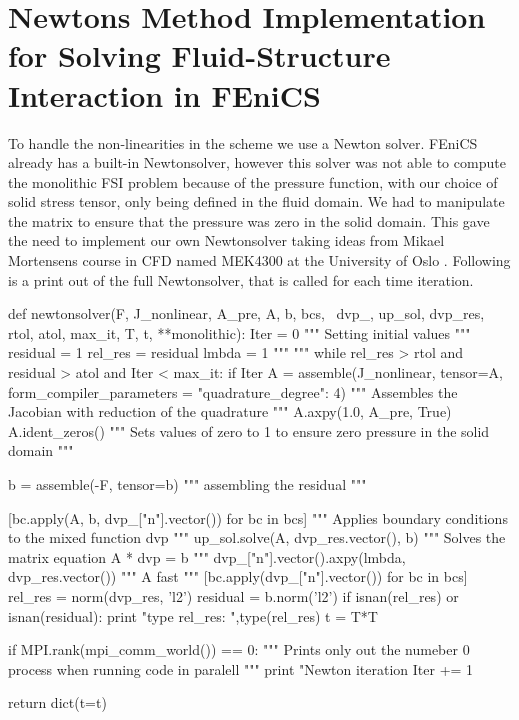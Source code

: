 \section{Newtons Method Implementation for Solving Fluid-Structure Interaction in FEniCS}
To handle the non-linearities in the scheme we use a Newton solver. FEniCS already has a built-in Newtonsolver, however this solver was not able to compute the monolithic FSI problem because of the pressure function, with our choice of solid stress tensor, only being defined in the fluid domain. We had to manipulate the matrix to ensure that the pressure was zero in the solid domain. This gave the need to implement our own Newtonsolver taking ideas from Mikael Mortensens course in CFD named MEK4300 at the University of Oslo \cite{White2006}.
Following is a print out of the full Newtonsolver, that is called for each time iteration.
\newpage
\begin{python}
def newtonsolver(F, J_nonlinear, A_pre, A, b, bcs, \
                dvp_, up_sol, dvp_res, rtol, atol, max_it, T, t, **monolithic):
    Iter      = 0  """ Setting initial values """
    residual   = 1  
    rel_res    = residual
    lmbda = 1 """  """
    while rel_res > rtol and residual > atol and Iter < max_it:
        if Iter %
            A = assemble(J_nonlinear, tensor=A, form_compiler_parameters = {"quadrature_degree": 4}) """ Assembles the Jacobian with reduction of the quadrature """
            A.axpy(1.0, A_pre, True)
            A.ident_zeros()  """ Sets values of zero to 1 to ensure zero pressure in the solid domain """

        b = assemble(-F, tensor=b) """ assembling the residual  """

        [bc.apply(A, b, dvp_["n"].vector()) for bc in bcs] """ Applies boundary conditions to the mixed function dvp """
        up_sol.solve(A, dvp_res.vector(), b) """ Solves the matrix equation A * dvp = b """
        dvp_["n"].vector().axpy(lmbda, dvp_res.vector())   """ A fast   """
        [bc.apply(dvp_["n"].vector()) for bc in bcs] 
        rel_res = norm(dvp_res, 'l2')
        residual = b.norm('l2')                     
        if isnan(rel_res) or isnan(residual):
            print "type rel_res: ",type(rel_res)
            t = T*T

        if MPI.rank(mpi_comm_world()) == 0:   """ Prints only out the numeber 0 process when running code in paralell  """
            print "Newton iteration %
        Iter += 1

    return dict(t=t)
\end{python}




	